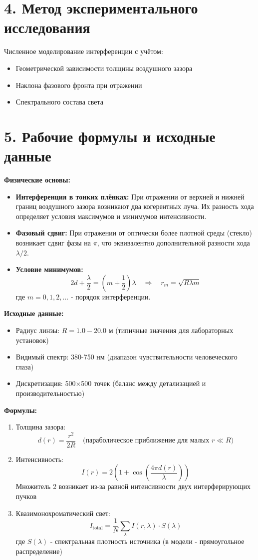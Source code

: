 \documentclass[10pt]{article}
\begin{document}
	\section*{4. Метод экспериментального исследования}
	
	Численное моделирование интерференции с учётом:
	\begin{itemize}
		\item Геометрической зависимости толщины воздушного зазора
		\item Наклона фазового фронта при отражении
		\item Спектрального состава света
	\end{itemize}
	\section*{5. Рабочие формулы и исходные данные}

\textbf{Физические основы:}
\begin{itemize}
    \item \textbf{Интерференция в тонких плёнках:} При отражении от верхней и нижней границ воздушного зазора возникают два когерентных луча. Их разность хода определяет условия максимумов и минимумов интенсивности.
    
    \item \textbf{Фазовый сдвиг:} При отражении от оптически более плотной среды (стекло) возникает сдвиг фазы на $\pi$, что эквивалентно дополнительной разности хода $\lambda/2$.
    
    \item \textbf{Условие минимумов:} 
    $$ 2d + \frac{\lambda}{2} = (m + \frac{1}{2})\lambda \quad \Rightarrow \quad r_m = \sqrt{R\lambda m} $$
    где $m = 0,1,2,...$ - порядок интерференции.
\end{itemize}

\textbf{Исходные данные:}
\begin{itemize}
    \item Радиус линзы: $R = 1.0-20.0$ м (типичные значения для лабораторных установок)
    \item Видимый спектр: 380-750 нм (диапазон чувствительности человеческого глаза)
    \item Дискретизация: 500×500 точек (баланс между детализацией и производительностью)
\end{itemize}

\textbf{Формулы:}
\begin{enumerate}
    \item Толщина зазора: $$ d(r) = \frac{r^2}{2R} \quad \text{(параболическое приближение для малых } r \ll R\text{)} $$
    
    \item Интенсивность: $$ I(r) = 2\left(1 + \cos\left(\frac{4\pi d(r)}{\lambda}\right)\right) $$
    Множитель 2 возникает из-за равной интенсивности двух интерферирующих пучков
    
    \item Квазимонохроматический свет: $$ I_{\text{total}} = \frac{1}{N}\sum_{\lambda} I(r,\lambda) \cdot S(\lambda) $$
    где $S(\lambda)$ - спектральная плотность источника (в модели - прямоугольное распределение)
\end{enumerate}
\end{document}
